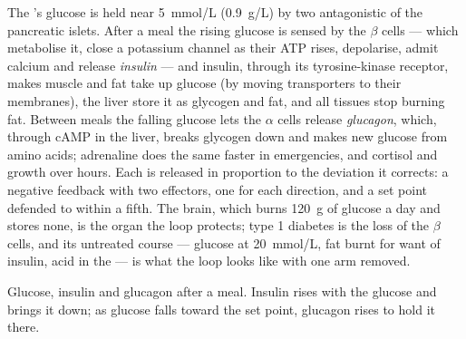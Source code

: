 \begin{proposition}\label{prop:b2:cell-signalling:glucose}
The 's glucose is held near \qty{5}{mmol/L} (\qty{0.9}{g/L}) by
two antagonistic  of the pancreatic islets. After a meal
the rising glucose is sensed by the $\beta$ cells --- which
metabolise it, close a potassium channel as their ATP rises,
depolarise, admit calcium and release \emph{insulin} --- and insulin,
through its tyrosine-kinase receptor, makes muscle and fat take up
glucose (by moving transporters to their membranes), the liver
store it as glycogen and fat, and all tissues stop burning fat.
Between meals the falling glucose lets the $\alpha$ cells release
\emph{glucagon}, which, through cAMP in the liver, breaks glycogen
down and makes new glucose from amino acids; adrenaline does the
same faster in emergencies, and cortisol and growth  over
hours. Each  is released in proportion to the deviation it
corrects: a negative feedback with two effectors, one for each
direction, and a set point defended to within a fifth. The brain,
which burns \qty{120}{g} of glucose a day and stores none, is the
organ the loop protects; type 1 diabetes is the loss of the
$\beta$ cells, and its untreated course --- glucose at
\qty{20}{mmol/L}, fat burnt for want of insulin, acid in the 
--- is what the loop looks like with one arm removed.
\end{proposition}

\begin{omfigure}

{\small Glucose, insulin and glucagon after a meal. Insulin rises
with the glucose and brings it down; as glucose falls toward the set
point, glucagon rises to hold it there.}
\end{omfigure}

